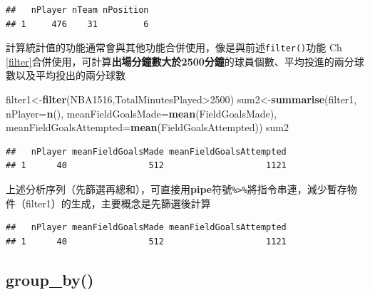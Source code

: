 \documentclass[]{book}
\newenvironment{Shaded}{\begin{snugshade}}{\end{snugshade}}
\newcommand{\KeywordTok}[1]{\textcolor[rgb]{0.13,0.29,0.53}{\textbf{{#1}}}}
\newcommand{\DataTypeTok}[1]{\textcolor[rgb]{0.13,0.29,0.53}{{#1}}}
\newcommand{\DecValTok}[1]{\textcolor[rgb]{0.00,0.00,0.81}{{#1}}}
\newcommand{\StringTok}[1]{\textcolor[rgb]{0.31,0.60,0.02}{{#1}}}
\newcommand{\NormalTok}[1]{{#1}}
\theoremstyle{definition}
\theoremstyle{definition}
\theoremstyle{remark}
\begin{document}
\begin{verbatim}
##   nPlayer nTeam nPosition
## 1     476    31         6
\end{verbatim}

計算統計值的功能通常會與其他功能合併使用，像是與前述\texttt{filter()}功能
Ch
\ref{filter}合併使用，可計算\textbf{出場分鐘數大於2500分鐘}的球員個數、平均投進的兩分球數以及平均投出的兩分球數

\begin{Shaded}
\begin{Highlighting}[]
\NormalTok{filter1<-}\KeywordTok{filter}\NormalTok{(NBA1516,TotalMinutesPlayed>}\DecValTok{2500}\NormalTok{)}
\NormalTok{sum2<-}\KeywordTok{summarise}\NormalTok{(filter1,}
                \DataTypeTok{nPlayer=}\KeywordTok{n}\NormalTok{(),}
                \DataTypeTok{meanFieldGoalsMade=}\KeywordTok{mean}\NormalTok{(FieldGoalsMade),}
                \DataTypeTok{meanFieldGoalsAttempted=}\KeywordTok{mean}\NormalTok{(FieldGoalsAttempted))}
\NormalTok{sum2}
\end{Highlighting}
\end{Shaded}

\begin{verbatim}
##   nPlayer meanFieldGoalsMade meanFieldGoalsAttempted
## 1      40                512                    1121
\end{verbatim}

上述分析序列（先篩選再總和），可直接用\textbf{pipe}符號\texttt{\%\textgreater{}\%}將指令串連，減少暫存物件（filter1）的生成，主要概念是先篩選後計算

\begin{Shaded}
\end{Shaded}

\begin{verbatim}
##   nPlayer meanFieldGoalsMade meanFieldGoalsAttempted
## 1      40                512                    1121
\end{verbatim}

\subsection{group\_by()}\label{group_by}
\end{document}

